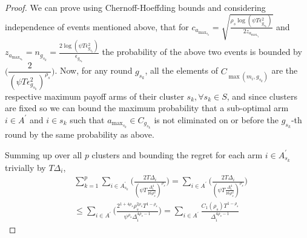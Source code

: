 \begin{proof}
We can prove using Chernoff-Hoeffding bounds and considering independence of events mentioned above, that for $c_{a_{\max_{s_{k}}}}=\sqrt{\frac{\rho_{s} \log (\psi T\epsilon_{g_{s_{k}}}^{2})}{2 z_{a_{\max_{s_{k}}}}}}$ and  $z_{a_{\max_{s_{k}}}}= n_{g_{s_{k}}}=\frac{2\log{(\psi T\epsilon_{g_{s_{k}}}^{2})}}{\epsilon_{g_{s_{k}}}}$ the probability of the above two events is bounded by $\bigg(\dfrac{2}{(\psi  T\epsilon_{g_{s_{k}}}^{2})^{\rho_{s}}}\bigg)$.
  Now, for any round $g_{s_{k}}$, all the elements of $C_{\max(m_{i},g_{s_{k}})}$ are the respective maximum payoff arms of their cluster $s_{k}, \forall s_{k}\in S$, and since clusters are fixed so we can bound the maximum probability that a sub-optimal arm ${i}\in A^{'}$  and ${i}\in s_{k}$ such that $a_{\max_{s_{k}}}\in C_{g_{s_{k}}}$ is not eliminated on or before the $g_{s_{k}}$-th round by the same probability as above. 

 

Summing up over all $p$ clusters and bounding the regret for each arm $i\in A_{s_{k}}^{'}$ trivially by $T\Delta_{i}$,
 \begin{align*}
 &\sum_{k=1}^{p}\sum_{i\in A_{s_{k}}^{'}}\bigg(\frac{2T\Delta_{i}}{(\psi T\frac{\Delta_{i}^{4}}{16\rho_{s}^{2}})^{\rho_{s}}}\bigg) = \sum_{i\in A^{'}}\bigg(\frac{2T\Delta_{i}}{(\psi  T\frac{\Delta_{i}^{4}}{16\rho_{s}^{2}})^{\rho_{s}}}\bigg) \\
 &\leq \sum_{i\in A^{'}}\bigg(\frac{2^{1+4\rho_{s}}\rho_{s}^{2\rho_{s}}T^{1-\rho_{s}}}{\psi^{\rho_{s}}\Delta_{i}^{4\rho_{s}-1}}\bigg) = \sum_{i\in A^{'}}\frac{C_{1}(\rho_{s})T^{1-\rho_{s}}}{\Delta_{i}^{4\rho_{s}-1}}
 \end{align*}


\end{proof}
